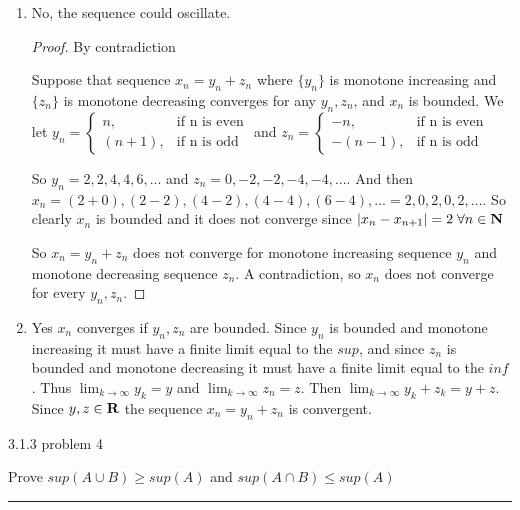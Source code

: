 \documentclass[11pt]{article}
\begin{document}
\begin{enumerate}
	\item No, the sequence could oscillate.
	
	\begin{proof} By contradiction
	
	Suppose that sequence $x_n = y_n + z_n$ where $\{y_n\}$ is monotone increasing and $\{z_n\}$ is monotone decreasing converges for any $y_n, z_n$, and $x_n$ is bounded. We let 
	$y_n = \begin{cases}
	n, & \text{if n is even}\\
	(n+1), & \text{if n is odd}
	\end{cases}$ and 
	$z_n = \begin{cases}
	-n, & \text{if n is even}\\
	-(n-1), & \text{if n is odd}
	\end{cases}$
	
	So $y_n = 2, 2, 4, 4, 6, ...$ and $z_n = 0, -2, -2, -4, -4,... $. And then 
	$x_n = (2 + 0), (2 -2), (4 -2), (4 - 4), (6-4), ... = 2, 0, 2, 0, 2, ...$. 
	So clearly $x_n$ is bounded and it does not converge since 
	$|x_n - x_{n+1}| = 2 \; 	\forall n\in \mathbf{N}$
	
	So $x_n = y_n + z_n$ does not converge for monotone increasing sequence $y_n$ 
	and monotone decreasing sequence $z_n$. 
	A contradiction, so $x_n$ does not converge for every $y_n, z_n$.
	\end{proof}	 
	
	\item Yes $x_n$ converges if $y_n, z_n$ are bounded. 
	Since $y_n$ is bounded and monotone increasing it must have a finite limit equal to the $sup$, 
	and since $z_n$ is bounded and monotone decreasing it must have a finite limit equal to the $inf$. 
	Thus $\lim_{k \to \infty} y_k = y$ and $\lim_{k \to \infty} z_n = z$.
	Then $\lim_{k \to \infty} y_k + z_k = y + z$.
	Since $y, z \in \mathbf{R}$ the sequence $x_n = y_n + z_n$ is convergent.
		
	
\end{enumerate}


	


\newpage
{} 3.1.3 problem 4

Prove $sup(A \cup B) \geq sup (A)$ and $sup(A\cap B) \leq sup(A)$

\hrule
\end{document}
